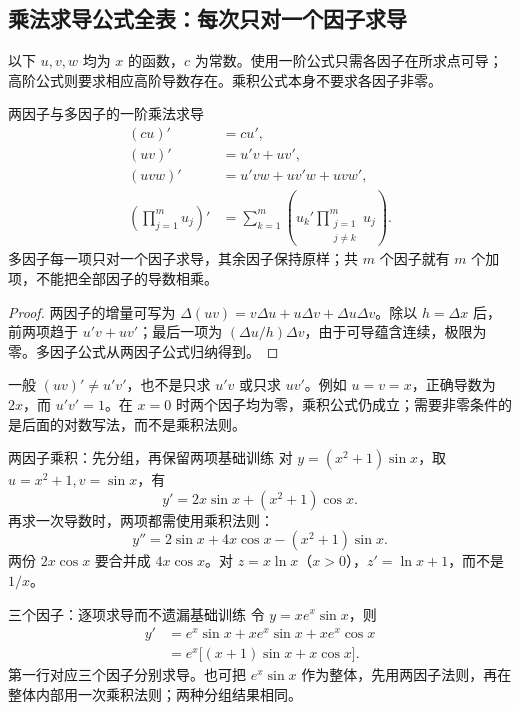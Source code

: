 \subsection{乘法求导公式全表：每次只对一个因子求导}\label{r2:product}
以下 $u,v,w$ 均为 $x$ 的函数，$c$ 为常数。使用一阶公式只需各因子在所求点可导；高阶公式则要求相应高阶导数存在。乘积公式本身不要求各因子非零。

\begin{theorem}{两因子与多因子的一阶乘法求导}
\begin{align*}
 (cu)'&=cu',\\
 (uv)'&=u'v+uv',\\
 (uvw)'&=u'vw+uv'w+uvw',\\
 \left(\prod_{j=1}^m u_j\right)'&=
 \sum_{k=1}^m\left(u_k'\prod_{\substack{j=1\\j\ne k}}^m u_j\right).
\end{align*}
多因子每一项只对一个因子求导，其余因子保持原样；共 $m$ 个因子就有 $m$ 个加项，不能把全部因子的导数相乘。
\end{theorem}
\begin{proof}
两因子的增量可写为 $\Delta(uv)=v\Delta u+u\Delta v+\Delta u\Delta v$。除以 $h=\Delta x$ 后，前两项趋于 $u'v+uv'$；最后一项为 $(\Delta u/h)\Delta v$，由于可导蕴含连续，极限为零。多因子公式从两因子公式归纳得到。
\end{proof}

\begin{warning}
一般 $(uv)'\ne u'v'$，也不是只求 $u'v$ 或只求 $uv'$。例如 $u=v=x$，正确导数为 $2x$，而 $u'v'=1$。在 $x=0$ 时两个因子均为零，乘积公式仍成立；需要非零条件的是后面的对数写法，而不是乘积法则。
\end{warning}

\begin{example}{两因子乘积：先分组，再保留两项}{基础训练}
对 $y=(x^2+1)\sin x$，取 $u=x^2+1,v=\sin x$，有
\[
 y'=2x\sin x+(x^2+1)\cos x.
\]
再求一次导数时，两项都需使用乘积法则：
\[
 y''=2\sin x+4x\cos x-(x^2+1)\sin x.
\]
两份 $2x\cos x$ 要合并成 $4x\cos x$。对 $z=x\ln x$（$x>0$），$z'=\ln x+1$，而不是 $1/x$。
\end{example}

\begin{example}{三个因子：逐项求导而不遗漏}{基础训练}
令 $y=xe^x\sin x$，则
\begin{align*}
 y'&=e^x\sin x+xe^x\sin x+xe^x\cos x\\
   &=e^x\bigl[(x+1)\sin x+x\cos x\bigr].
\end{align*}
第一行对应三个因子分别求导。也可把 $e^x\sin x$ 作为整体，先用两因子法则，再在整体内部用一次乘积法则；两种分组结果相同。
\end{example}

